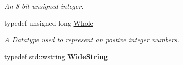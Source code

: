 \begin{DoxyCompactItemize}
\begin{DoxyCompactList}\small\item\em An 8-\/bit unsigned integer. \item\end{DoxyCompactList}\item 
typedef unsigned long \hyperlink{namespaceMezzanine_adcbb6ce6d1eb4379d109e51171e2e493}{Whole}
\begin{DoxyCompactList}\small\item\em A Datatype used to represent an postive integer numbers. \item\end{DoxyCompactList}\item 
\hypertarget{namespaceMezzanine_a9bd8d22fdfaf143314aa59a4374697e5}{
typedef std::wstring {\bfseries WideString}}
\label{namespaceMezzanine_a9bd8d22fdfaf143314aa59a4374697e5}

\end{DoxyCompactItemize}
